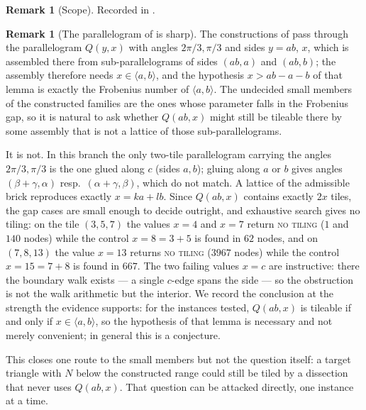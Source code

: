 \documentclass[11pt,reqno]{amsart}
\theoremstyle{plain}
\theoremstyle{definition}
\newtheorem{remark}[theorem]{Remark}
\begin{document}
\begin{remark}[Scope]\label{rem:ratfreescope}
Recorded in \cite{Obstructions}.
\end{remark}

\begin{remark}[The parallelogram of \cite{Zhang} is sharp]\label{rem:zhangsharp}
The constructions of \cite{Zhang} pass through the parallelogram $Q(y,x)$ with angles
$2\pi/3,\pi/3$ and sides $y=ab$, $x$, which is assembled there from sub-parallelograms of sides
$(ab,a)$ and $(ab,b)$; the assembly therefore needs $x\in\langle a,b\rangle$, and the hypothesis
$x>ab-a-b$ of that lemma is exactly the Frobenius number of $\langle a,b\rangle$. The undecided
small members of the constructed families are the ones whose parameter falls in the Frobenius gap,
so it is natural to ask whether $Q(ab,x)$ might still be tileable there by some assembly that is
not a lattice of those sub-parallelograms.

It is not. In this branch the only two-tile parallelogram carrying the angles $2\pi/3,\pi/3$ is the
one glued along $c$ (sides $a,b$); gluing along $a$ or $b$ gives angles $(\beta+\gamma,\alpha)$
resp.\ $(\alpha+\gamma,\beta)$, which do not match. A lattice of the admissible brick reproduces
exactly $x=ka+lb$. Since $Q(ab,x)$ contains exactly $2x$ tiles, the gap cases are small enough to
decide outright, and exhaustive search gives no tiling: on the tile $(3,5,7)$ the values $x=4$ and
$x=7$ return \textsc{no tiling} ($1$ and $140$ nodes) while the control $x=8=3+5$ is found in $62$
nodes, and on $(7,8,13)$ the value $x=13$ returns \textsc{no tiling} ($3967$ nodes) while the
control $x=15=7+8$ is found in $667$. The two failing values $x=c$ are instructive: there the
boundary walk exists --- a single $c$-edge spans the side --- so the obstruction is not the walk
arithmetic but the interior. We record the conclusion at the strength the evidence supports: for
the instances tested, $Q(ab,x)$ is tileable if and only if $x\in\langle a,b\rangle$, so the
hypothesis of that lemma is necessary and not merely convenient; in general this is a conjecture.

This closes one route to the small members but not the question itself: a target triangle with $N$
below the constructed range could still be tiled by a dissection that never uses $Q(ab,x)$. That
question can be attacked directly, one instance at a time.
\end{remark}
\end{document}
